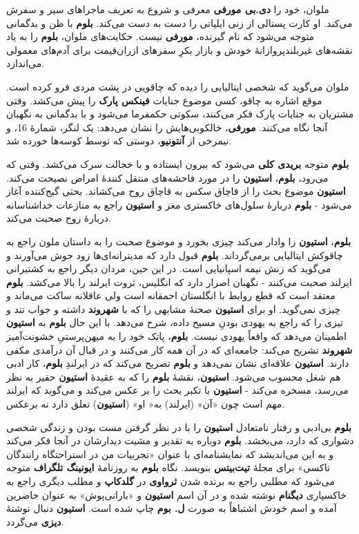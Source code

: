 \documentclass[12pt]{book}
\newcommand{\noun}[1]{{\textbf{#1}}}
\begin{document}
    ملوان، خود را \noun{دی.بی مورفی} معرفی و شروع به تعریف ماجراهای سیر و سفرش می‌کند. او کارت پستالی از زنی ایلیاتی را دست به دست می‌کند. \noun{بلوم} با ظن و بدگمانی متوجه می‌شود که نام گیرنده، \noun{مورفی} نیست. حکایت‌های ملوان، \noun{بلوم} را به یاد نقشه‌های غیربلندپروازانهٔ خودش و بازار بکرِ سفرهای ازران‌قیمت برای آدم‌های معمولی می‌اندازد.

    ملوان می‌گوید که شخصی ایتالیایی را دیده که چاقویی در پشت مردی فرو کرده است. موقع اشاره به چاقو، کسی موضوع جنایات \noun{فینکس پارک} را پیش می‌کشد. وقتی مشتریان به جنایات پارک فکر می‌کنند، سکوتی حکمفرما می‌شود و با بدگمانی به نگهبان آنجا نگاه می‌کنند. \noun{مورفی}، خالکوبی‌هایش را نشان می‌دهد: یک لنگر، شمارهٔ 16، و نیمرخی از \noun{آنتونیو}، دوستی که توسط کوسه‌ها خورده شد.

    \noun{بلوم} متوجه \noun{بریدی کلی} می‌شود که بیرون ایستاده و با خجالت سرک می‌کشد. وقتی که می‌رود، \noun{بلوم}، \noun{استیون} را در مورد فاحشه‌های منتقل کنندهٔ امراض نصیحت می‌کند. \noun{استیون} موضوع بحث را از قاچاق سکس به قاچاق روح می‌کشاند. بحثی گیج‌کننده آغاز می‌شود - \noun{بلوم} دربارهٔ سلول‌های خاکستری مغز و \noun{استیون} راجع به منازعات خداشناسانه دربارهٔ روح صحبت می‌کند.

    \noun{بلوم}، \noun{استیون} را وادار می‌کند چیزی بخورد و موضوع صحبت را به داستان ملون راجع به چاقوکش ایتالیایی برمی‌گرداند. \noun{بلوم} قبول دارد که مدیترانه‌ای‌ها زود جوش می‌آورند و می‌گوید که زنش نیمه اسپانیایی است. در این حین، مردان دیگر راجع به کشتیرانی ایرلند صحبت می‌کنند - نگهبان اصرار دارد که انگلیس، ثروت ایرلند را بالا می‌کشد. \noun{بلوم} معتقد است که قطع روابط با انگلستان احمقانه است ولی عاقلانه ساکت می‌ماند و چیزی نمی‌گوید. او برای \noun{استیون} صحنهٔ مشابهی را که با \noun{شهروند‬} داشته و جواب تند و تیزی را که راجع به یهودی بودنِ مسیح داده، شرح می‌دهد. با این حال \noun{بلوم} به \noun{استیون} اطمینان می‌دهد که واقعاً یهودی نیست. \noun{بلوم}، پاتک خود را به میهن‌پرستیِ خشونت‌آمیز \noun{شهروند‬} تشریح می‌کند: جامعه‌ای که در آن همه کار می‌کنند و در قبال آن درآمدی مکفی دارند. \noun{استیون} علاقه‌ای نشان نمی‌دهد و \noun{بلوم} تصریح می‌کند که در ایرلندِ \noun{بلوم}، کار ادبی هم شغل محسوب می‌شود. \noun{استیون}، نقشهٔ \noun{بلوم} را که به عقیدهٔ \noun{استیون} حقیر به نظر می‌رسد، مسخره می‌کند - \noun{استیون} با تکبر بحث را بر عکس می‌کند و می‌گوید که ایرلند مهم است چون «آن» (ایرلند) به« او» (\noun{استیون}) تعلق دارد نه برعکس.

    \noun{بلوم} بی‌ادبی و رفتار نامتعادل \noun{استیون} را با در نظر گرفتن مست بودن و زندگی شخصی دشواری که دارد، می‌بخشد. \noun{بلوم} دوباره به تقدیر و مشیت دیدارشان در آنجا فکر می‌کند و به این می‌اندیشد که نمایشنامه‌ای با عنوان «تجربیات من در استراحتگاه رانندگان تاکسی» برای مجلهٔ \noun{تیت‌بیتس} بنویسد. نگاه \noun{بلوم} به روزنامهٔ \noun{ایونینگ تلگراف} متوجه می‌شود که مطلبی راجع به برنده شدن \noun{ثرواوی} در \noun{گلدکاپ} و مطلب دیگری راجع به خاکسپاری \noun{دیگنام} نوشته شده و در آن اسم \noun{استیون} و «بارانی‌پوش» به عنوان حاضرین آمده و اسم خودش اشتباهاً به صورت \noun{ل. بوم} چاپ شده است. \noun{استیون} دنبال نوشتهٔ \noun{دیزی} می‌گردد.
\end{document}

